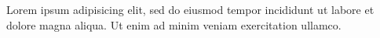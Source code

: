 \documentclass{article}
\begin{document}
Lorem ipsum  adipisicing elit,
sed do eiusmod tempor incididunt ut labore et dolore magna aliqua. Ut
enim ad minim veniam exercitation ullamco.
\end{document}
